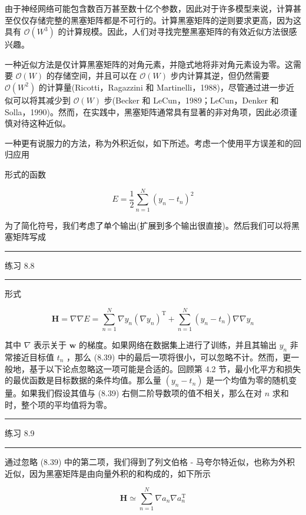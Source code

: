 \documentclass[10pt]{report}
\newcommand{\HRule}{\begin{center}\rule{0.9\linewidth}{0.2mm}\end{center}}
\begin{document}
由于神经网络可能包含数百万甚至数十亿个参数，因此对于许多模型来说，计算甚至仅仅存储完整的黑塞矩阵都是不可行的。计算黑塞矩阵的逆则要求更高，因为这具有 \(\mathcal{O}\left( {W}^{3}\right)\) 的计算规模。因此，人们对寻找完整黑塞矩阵的有效近似方法很感兴趣。

一种近似方法是仅计算黑塞矩阵的对角元素，并隐式地将非对角元素设为零。这需要 \(\mathcal{O}\left( W\right)\) 的存储空间，并且可以在 \(\mathcal{O}\left( W\right)\) 步内计算其逆，但仍然需要 \(\mathcal{O}\left( {W}^{2}\right)\) 的计算量(Ricotti，Ragazzini 和 Martinelli，1988)，尽管通过进一步近似可以将其减少到 \(\mathcal{O}\left( W\right)\) 步(Becker 和 LeCun，1989；LeCun，Denker 和 Solla，1990)。然而，在实践中，黑塞矩阵通常具有显著的非对角项，因此必须谨慎对待这种近似。

一种更有说服力的方法，称为外积近似，如下所述。考虑一个使用平方误差和的回归应用

形式的函数

\[
E = \frac{1}{2}\mathop{\sum }\limits_{{n = 1}}^{N}{\left( {y}_{n} - {t}_{n}\right) }^{2} \tag{8.38}
\]

为了简化符号，我们考虑了单个输出(扩展到多个输出很直接)。然后我们可以将黑塞矩阵写成

\HRule

练习 8.8

\HRule

形式

\[
\mathbf{H} = \nabla \nabla E = \mathop{\sum }\limits_{{n = 1}}^{N}\nabla {y}_{n}{\left( \nabla {y}_{n}\right) }^{\mathrm{T}} + \mathop{\sum }\limits_{{n = 1}}^{N}\left( {{y}_{n} - {t}_{n}}\right) \nabla \nabla {y}_{n} \tag{8.39}
\]

其中 \(\nabla\) 表示关于 \(\mathbf{w}\) 的梯度。如果网络在数据集上进行了训练，并且其输出 \({y}_{n}\) 非常接近目标值 \({t}_{n}\) ，那么 (8.39) 中的最后一项将很小，可以忽略不计。然而，更一般地，基于以下论点忽略这一项可能是合适的。回顾第 4.2 节，最小化平方和损失的最优函数是目标数据的条件均值。那么量 \(\left( {{y}_{n} - {t}_{n}}\right)\) 是一个均值为零的随机变量。如果我们假设其值与 (8.39) 右侧二阶导数项的值不相关，那么在对 \(n\) 求和时，整个项的平均值将为零。

\HRule

练习 8.9

\HRule

通过忽略 (8.39) 中的第二项，我们得到了列文伯格 - 马夸尔特近似，也称为外积近似，因为黑塞矩阵是由向量外积的和构成的，如下所示

\[
\mathbf{H} \simeq  \mathop{\sum }\limits_{{n = 1}}^{N}\nabla {a}_{n}\nabla {a}_{n}^{\mathrm{T}} \tag{8.40}
\]
\end{document}

